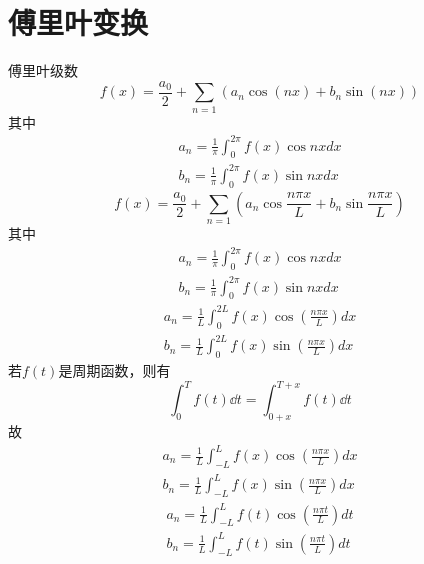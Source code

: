 
\section{傅里叶变换}
傅里叶级数
\begin{equation*}
	f(x) = \frac{a_0}{2} +
	\sum_{n=1}
	\left(
	a_n \cos(n x)  +
	b_n \sin(n x)
	\right)
\end{equation*}
其中
\begin{equation*}
	\begin{aligned}
		a_n = \frac{1}{\pi} \int_0^{2 \pi}  f(x) \cos{n x} d x \\
		b_n = \frac{1}{\pi} \int_0^{2 \pi}  f(x) \sin{n x} d x
	\end{aligned}
\end{equation*}
\begin{equation*}
	f(x) = \frac{a_0}{2} +
	\sum_{n=1}
	\left(
	a_n \cos{\frac{n \pi x}{L}}  +
	b_n \sin{\frac{n \pi x}{L}}
	\right)
\end{equation*}
其中
\begin{equation*}
	\begin{aligned}
		a_n = \frac{1}{\pi} \int_0^{2 \pi}  f(x) \cos{n x} d x \\
		b_n = \frac{1}{\pi} \int_0^{2 \pi}  f(x) \sin{n x} d x
	\end{aligned}
\end{equation*}
\begin{equation*}
	\begin{aligned}
		a_n = \frac{1}{L} \int_0^{2 L}  f(x) \cos(\frac{n \pi x}{L}) d x \\
		b_n = \frac{1}{L} \int_0^{2 L}  f(x) \sin(\frac{n \pi x}{L}) d x
	\end{aligned}
\end{equation*}
若\(f(t)\)是周期函数，则有
\begin{equation*}
	\int_0^{T}  f(t)  \dd t
	=
	\int_{0+x}^{T+x}  f(t)  \dd t
\end{equation*}
故
\begin{equation*}
	\begin{aligned}
		a_n = \frac{1}{L} \int_{-L}^{L}  f(x) \cos(\frac{n \pi x}{L}) d x \\
		b_n = \frac{1}{L} \int_{-L}^{ L}  f(x) \sin(\frac{n \pi x}{L}) d x
	\end{aligned}
\end{equation*}
\begin{equation}
	\begin{aligned}
		a_n = \frac{1}{L} \int_{-L}^{L}  f(t) \cos(\frac{n \pi t}{L}) d t \\
		b_n = \frac{1}{L} \int_{-L}^{ L}  f(t) \sin(\frac{n \pi t}{L}) d t
		\label{eq:Fourier_coeff}
	\end{aligned}
\end{equation}
